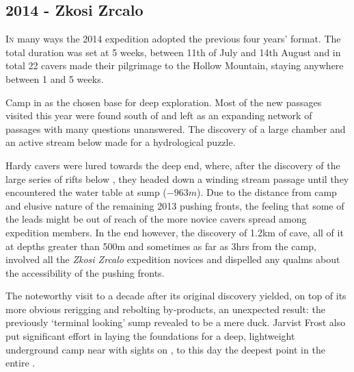 \newpage
\begin{tcolorbox}
	


\chapter{2014 - Zkosi Zrcalo}
		\lettrine{I}{n} many ways the 2014 expedition adopted the previous four years' format. The total duration was set at 5 weeks, between 11th of July and 14th August and in total 22 cavers made their pilgrimage to the Hollow Mountain, staying anywhere between 1 and 5 weeks. 

Camp  in  as the chosen base for deep exploration. Most of the new passages visited this year were found south of  and left as an expanding network of passages with many questions unanswered. The discovery of a large chamber and an active stream below made for a hydrological puzzle. 

		Hardy cavers were lured towards the deep end, where, after the discovery of the large series of rifts below , they headed down a winding stream passage until they encountered the water table at  sump ($-963m$).  Due to the distance from camp and elusive nature of the remaining 2013 pushing fronts, the feeling that some of the leads might be out of reach of the more novice cavers spread among expedition members. In the end however, the discovery of 1.2km of cave, all of it at depths greater than 500m and sometimes as far as 3hrs from the camp, involved all the \emph{Zkosi Zrcalo} expedition novices and dispelled any qualms about the accessibility of the pushing fronts.

 		The noteworthy visit to  a decade after its original discovery yielded, on top of its more obvious rerigging and rebolting by-products, an unexpected result: the previously `terminal looking' sump revealed to be a mere duck. Jarvist Frost also put significant effort in laying the foundations for a deep, lightweight underground camp near  with sights on , to this day the deepest point in the entire .
		
		
\end{tcolorbox}
